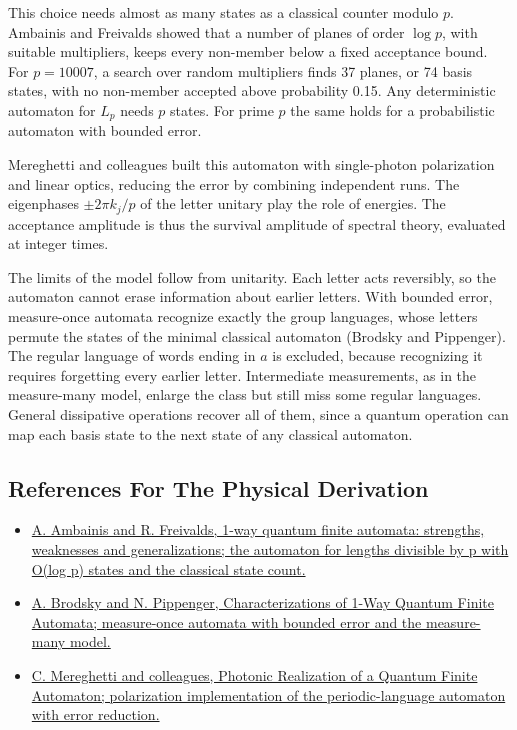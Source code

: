 \documentclass[11pt,oneside]{book}
\begin{document}
This choice needs almost as many states as a classical counter modulo \(p\). Ambainis and Freivalds showed that a number of planes of order \(\log p\), with suitable multipliers, keeps every non-member below a fixed acceptance bound. For \(p=10007\), a search over random multipliers finds 37 planes, or 74 basis states, with no non-member accepted above probability 0.15. Any deterministic automaton for \(L_p\) needs \(p\) states. For prime \(p\) the same holds for a probabilistic automaton with bounded error.

Mereghetti and colleagues built this automaton with single-photon polarization and linear optics, reducing the error by combining independent runs. The eigenphases \(\pm2\pi k_j/p\) of the letter unitary play the role of energies. The acceptance amplitude is thus the survival amplitude of spectral theory, evaluated at integer times.

The limits of the model follow from unitarity. Each letter acts reversibly, so the automaton cannot erase information about earlier letters. With bounded error, measure-once automata recognize exactly the group languages, whose letters permute the states of the minimal classical automaton (Brodsky and Pippenger). The regular language of words ending in \(a\) is excluded, because recognizing it requires forgetting every earlier letter. Intermediate measurements, as in the measure-many model, enlarge the class but still miss some regular languages. General dissipative operations recover all of them, since a quantum operation can map each basis state to the next state of any classical automaton.

\subsection*{References For The Physical Derivation}
\begin{itemize}
\item \href{https://arxiv.org/abs/quant-ph/9802062}{A. Ambainis and R. Freivalds, 1-way quantum finite automata: strengths, weaknesses and generalizations; the automaton for lengths divisible by p with O(log p) states and the classical state count.}
\item \href{https://arxiv.org/abs/quant-ph/9903014}{A. Brodsky and N. Pippenger, Characterizations of 1-Way Quantum Finite Automata; measure-once automata with bounded error and the measure-many model.}
\item \href{https://arxiv.org/abs/2001.10749}{C. Mereghetti and colleagues, Photonic Realization of a Quantum Finite Automaton; polarization implementation of the periodic-language automaton with error reduction.}
\end{itemize}
\end{document}
